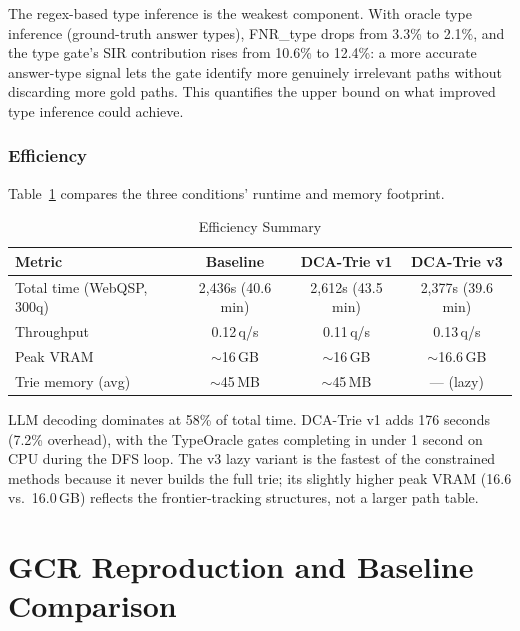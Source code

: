 The regex-based type inference is the weakest component. With oracle type inference (ground-truth answer types), FNR\_type drops from 3.3\% to 2.1\%, and the type gate's SIR contribution rises from 10.6\% to 12.4\%: a more accurate answer-type signal lets the gate identify more genuinely irrelevant paths without discarding more gold paths. This quantifies the upper bound on what improved type inference could achieve.

\subsubsection{Efficiency}

Table~\ref{tab:efficiency_summary} compares the three conditions' runtime and memory footprint.

\begin{table}[H]
  \centering
  \caption[Efficiency Summary]{Efficiency Summary}
  \label{tab:efficiency_summary}
  \begin{tabularx}{\textwidth}{|X|c|c|c|}
    \hline
    \textbf{Metric} & \textbf{Baseline} & \textbf{DCA-Trie v1} & \textbf{DCA-Trie v3} \\
    \hline
    Total time (WebQSP, 300q) & 2,436s (40.6 min) & 2,612s (43.5 min) & 2,377s (39.6 min) \\
    \hline
    Throughput & 0.12\,q/s & 0.11\,q/s & 0.13\,q/s \\
    \hline
    Peak VRAM & $\sim$16\,GB & $\sim$16\,GB & $\sim$16.6\,GB \\
    \hline
    Trie memory (avg) & $\sim$45\,MB & $\sim$45\,MB & --- (lazy) \\
    \hline
  \end{tabularx}
\end{table}

LLM decoding dominates at 58\% of total time. DCA-Trie v1 adds 176 seconds (7.2\% overhead), with the TypeOracle gates completing in under 1 second on CPU during the DFS loop. The v3 lazy variant is the fastest of the constrained methods because it never builds the full trie; its slightly higher peak VRAM (16.6 vs.\ 16.0\,GB) reflects the frontier-tracking structures, not a larger path table.

\section{GCR Reproduction and Baseline Comparison}
\label{sec:ch4repro}

